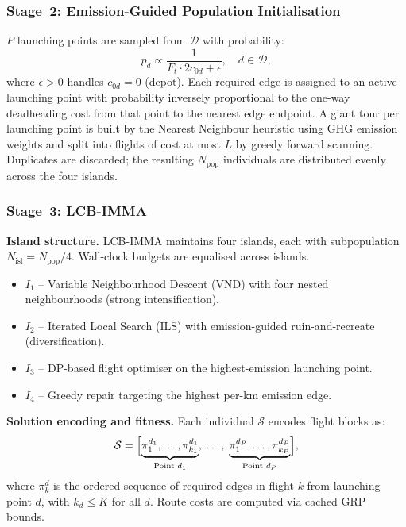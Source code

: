 \documentclass[a4paper,fleqn]{cas-dc}
\begin{document}
\subsubsection{Stage~2: Emission-Guided Population Initialisation}\label{sec:alg2}

$P$ launching points are sampled from $\mathcal{D}$ with probability:
\begin{equation}\label{eq:lp_prob}
 p_d \propto \frac{1}{F_t \cdot 2 c_{0d} + \epsilon}, \quad d \in \mathcal{D},
\end{equation}
where $\epsilon > 0$ handles $c_{0d} = 0$ (depot). Each required edge is assigned to an active launching point with probability inversely proportional to the one-way deadheading cost from that point to the nearest edge endpoint. A giant tour per launching point is built by the Nearest Neighbour heuristic using GHG emission weights and split into flights of cost at most $L$ by greedy forward scanning. Duplicates are discarded; the resulting $N_{\mathrm{pop}}$ individuals are distributed evenly across the four islands.

\subsubsection{Stage~3: LCB-IMMA}\label{sec:alg3}

\textbf{Island structure.}
LCB-IMMA maintains four islands, each with subpopulation $N_{\mathrm{isl}} = N_{\mathrm{pop}} / 4$. Wall-clock budgets are equalised across islands.

\begin{itemize}
 \item $I_1$ – Variable Neighbourhood Descent (VND) with four nested neighbourhoods (strong intensification).
 \item $I_2$ – Iterated Local Search (ILS) with emission-guided ruin-and-recreate (diversification).
 \item $I_3$ – DP-based flight optimiser on the highest-emission launching point.
 \item $I_4$ – Greedy repair targeting the highest per-km emission edge.
\end{itemize}

\textbf{Solution encoding and fitness.}
Each individual $\mathcal{S}$ encodes flight blocks as:
\begin{equation}\label{eq:encoding}
\mathcal{S} = \Bigl[
 \underbrace{\pi^{d_1}_1,\dots,\pi^{d_1}_{k_1}}_{\text{Point }d_1},\;\dots,\;
 \underbrace{\pi^{d_P}_1,\dots,\pi^{d_P}_{k_P}}_{\text{Point }d_P}
\Bigr],
\end{equation}
where $\pi^d_k$ is the ordered sequence of required edges in flight $k$ from launching point $d$, with $k_d \leq K$ for all $d$. Route costs are computed via cached GRP bounds.
\end{document}

